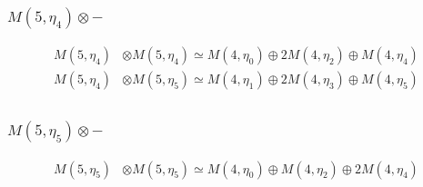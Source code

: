 \subsubsection{$ M(5,\eta_{4})\otimes -$}
\begin{align*}
M(5,\eta_{4}) &\otimes M(5,\eta_{4}) \simeq M(4,\eta_{0}) \oplus 2 M(4,\eta_{2}) \oplus M(4,\eta_{4}) \\
M(5,\eta_{4}) &\otimes M(5,\eta_{5}) \simeq M(4,\eta_{1}) \oplus 2 M(4,\eta_{3}) \oplus M(4,\eta_{5}) \\
\end{align*}

\subsubsection{$ M(5,\eta_{5})\otimes -$}
\begin{align*}
M(5,\eta_{5}) &\otimes M(5,\eta_{5}) \simeq M(4,\eta_{0}) \oplus M(4,\eta_{2}) \oplus 2 M(4,\eta_{4}) \\
\end{align*}

